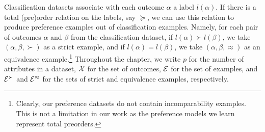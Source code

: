 Classification datasets associate with each outcome $\alpha$ a label
$l(\alpha)$. If there is a total (pre)order relation on the labels, say
$\succeq$, we can use this relation to produce preference examples out of
classification examples. Namely, for each pair of outcomes $\alpha$ and $\beta$
from the classification dataset, if $l(\alpha) \succ l(\beta)$, we take 
$(\alpha,\beta,\succ)$ as a strict example, and if $l(\alpha)= l(\beta)$, 
we take $(\alpha,\beta,\approx)$ as an equivalence example.\footnote{Clearly, 
our preference datasets do not contain incomparability examples. This is not 
a limitation in our work as the preference models we learn represent total 
preorders.} Throughout the chapter, we write $p$ for the number of attributes
in a dataset, $\mathcal{X}$ for the set of outcomes, $\mathcal{E}$ for the set of examples, 
and $\mathcal{E}^{\succ}$ and $\mathcal{E}^{\approx}$ for the sets of strict and equivalence
examples, respectively.


